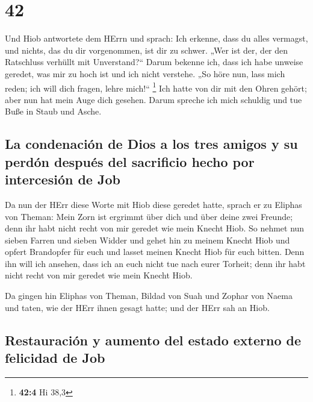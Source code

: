 \hypertarget{section-41}{%
\section{42}\label{section-41}}

 Und Hiob antwortete dem HErrn und sprach: 
Ich erkenne, dass du alles vermagst, und nichts, das du dir vorgenommen,
ist dir zu schwer.  „Wer ist der, der den Ratschluss
verhüllt mit Unverstand?{}`` Darum bekenne ich, dass ich habe unweise
geredet, was mir zu hoch ist und ich nicht verstehe.  „So
höre nun, lass mich reden; ich will dich fragen, lehre mich!{}``
\footnote{\textbf{42:4} Hi 38,3}  Ich hatte von dir mit
den Ohren gehört; aber nun hat mein Auge dich gesehen. 
Darum spreche ich mich schuldig und tue Buße in Staub und Asche.

\hypertarget{la-condenaciuxf3n-de-dios-a-los-tres-amigos-y-su-perduxf3n-despuuxe9s-del-sacrificio-hecho-por-intercesiuxf3n-de-job}{%
\subsection{La condenación de Dios a los tres amigos y su perdón después
del sacrificio hecho por intercesión de
Job}\label{la-condenaciuxf3n-de-dios-a-los-tres-amigos-y-su-perduxf3n-despuuxe9s-del-sacrificio-hecho-por-intercesiuxf3n-de-job}}

 Da nun der HErr diese Worte mit Hiob diese geredet hatte,
sprach er zu Eliphas von Theman: Mein Zorn ist ergrimmt über dich und
über deine zwei Freunde; denn ihr habt nicht recht von mir geredet wie
mein Knecht Hiob.  So nehmet nun sieben Farren und sieben
Widder und gehet hin zu meinem Knecht Hiob und opfert Brandopfer für
euch und lasset meinen Knecht Hiob für euch bitten. Denn ihn will ich
ansehen, dass ich an euch nicht tue nach eurer Torheit; denn ihr habt
nicht recht von mir geredet wie mein Knecht Hiob.

 Da gingen hin Eliphas von Theman, Bildad von Suah und
Zophar von Naema und taten, wie der HErr ihnen gesagt hatte; und der
HErr sah an Hiob.

\hypertarget{restauraciuxf3n-y-aumento-del-estado-externo-de-felicidad-de-job}{%
\subsection{Restauración y aumento del estado externo de felicidad de
Job}\label{restauraciuxf3n-y-aumento-del-estado-externo-de-felicidad-de-job}}

